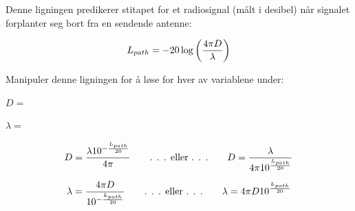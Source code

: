 

Denne ligningen predikerer stitapet for et radiosignal (målt i desibel) når signalet forplanter seg bort fra en sendende antenne:

$$L_{path} = -20 \log \left(4 \pi D \over \lambda \right)$$

Manipuler denne ligningen for å løse for hver av variablene under:

\vskip 10pt

$D =$

\vskip 10pt

$\lambda =$

\vskip 10pt







$$D = {\lambda 10^{-{L_{path} \over 20}} \over 4 \pi} \hskip 20pt \hbox{. . . eller . . .} \hskip 20pt D = {\lambda \over 4 \pi 10^{L_{path} \over 20}}$$

\vskip 20pt

$$\lambda = {4 \pi D \over 10^{-{L_{path} \over 20}}} \hskip 20pt \hbox{. . . eller . . .} \hskip 20pt \lambda = 4 \pi D 10^{L_{path} \over 20}$$










